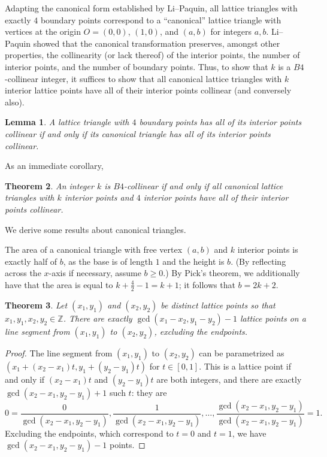 \documentclass{article}
\theoremstyle{mydefstyle}
\newtheorem{theorem}{Theorem}
\newtheorem{lemma}[theorem]{Lemma}
\newcommand{\zz}[0]{\mathbb Z}
\begin{document}

Adapting the canonical form established by Li--Paquin\cite{li2025lattice}, all lattice triangles with exactly $4$ boundary points correspond to a ``canonical'' lattice triangle with vertices at the origin $O=(0,0)$, $(1,0)$, and $(a,b)$ for integers $a,b$. Li--Paquin showed that the canonical transformation preserves, amongst other properties, the collinearity (or lack thereof) of the interior points, the number of interior points, and the number of boundary points. Thus, to show that $k$ is a $B4$-collinear integer, it suffices to show that all canonical lattice triangles with $k$ interior lattice points have all of their interior points collinear (and conversely also). 

\begin{lemma}
A lattice triangle with $4$ boundary points has all of its interior points collinear if and only if its canonical triangle has all of its interior points collinear. 
\end{lemma}

As an immediate corollary, 
\begin{theorem}
\label{canonical:label}
An integer $k$ is $B4$-collinear if and only if all canonical lattice triangles with $k$ interior points and $4$ interior points have all of their interior points collinear. 
\end{theorem}

We derive some results about canonical triangles. 

The area of a canonical triangle with free vertex $(a,b)$ and $k$ interior points is exactly half of $b$, as the base is of length $1$ and the height is $b$. (By reflecting across the $x$-axis if necessary, assume $b\ge0$.) By Pick's theorem, we additionally have that the area is equal to $k+\frac42-1=k+1$; it follows that $b=2k+2$. 

\begin{theorem}
\label{seglatpntctr:label}
Let $(x_1,y_1)$ and $(x_2,y_2)$ be distinct lattice points so that $x_1,y_1,x_2,y_2\in\zz$. There are exactly $\gcd(x_1-x_2,y_1-y_2)-1$ lattice points on a line segment from $(x_1,y_1)$ to $(x_2,y_2)$, excluding the endpoints. 
\end{theorem}

\begin{proof}
The line segment from $(x_1,y_1)$ to $(x_2,y_2)$ can be parametrized as $(x_1+(x_2-x_1)t,y_1+(y_2-y_1)t)$ for $t\in[0,1]$. This is a lattice point if and only if $(x_2-x_1)t$ and $(y_2-y_1)t$ are both integers, and there are exactly $\gcd(x_2-x_1,y_2-y_1)+1$ such $t$: they are \[0=\frac0{\gcd(x_2-x_1,y_2-y_1)},\frac1{\gcd(x_2-x_1,y_2-y_1)},\dots,\frac{\gcd(x_2-x_1,y_2-y_1)}{\gcd(x_2-x_1,y_2-y_1)}=1.\] Excluding the endpoints, which correspond to $t=0$ and $t=1$, we have $\gcd(x_2-x_1,y_2-y_1)-1$ points. 
\end{proof}
\end{document}

